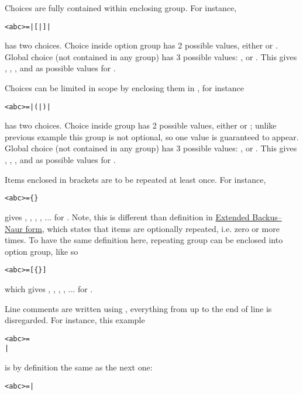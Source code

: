 \clearpage %

Choices are fully contained within enclosing group. For instance,
\begin{alltt}
<abc> =  |  [  |  ]  | 
\end{alltt}
has two choices. Choice inside option group \algfmt{[ ]} has 2 possible values,
either  or . Global choice (not contained in any group) has 3 possible
values: , \algfmt{[}\algfmt{|}\algfmt{]} or .
This gives , , ,  and  as possible values for
.

Choices can be limited in scope by enclosing them in \algfmt{( )},
for instance
\begin{alltt}
<abc> =  |  (  |  )  | 
\end{alltt}
has two choices. Choice inside group \algfmt{( )} has 2 possible values,
either  or ; unlike previous example this group is not optional, so one
value is guaranteed to appear. Global choice (not contained in any group) has 3 possible
values: , \algfmt{(}\algfmt{|}\algfmt{)}
or . This gives , , , and  as possible values
for .

Items enclosed in \algfmt{\{ \}} brackets are to be repeated at least once. For instance,
\begin{alltt}
<abc> =  \{  \} 
\end{alltt}
gives , , , , ... for .\newline
\indent
Note, this is different than definition in
\href{https://en.wikipedia.org/wiki/Extended_Backus%E2%80%93Naur_form#Table_of_symbols}{Extended Backus–Naur form},
which states that items are optionally repeated, i.e. zero or more times.\newline
\indent
To have the same definition here, repeating group can be enclosed into option group,
like so
\begin{alltt}
<abc> =  [ \{  \} ] 
\end{alltt}
which gives , , , , ... for .

Line comments are written using \algfmti{\$}, everything from \algfmti{\$} up to the
end of line is disregarded. For instance, this example
\begin{alltt}
<abc> = 
   
|  
\end{alltt}
is by definition the same as the next one:
\begin{alltt}
<abc> =  | 
\end{alltt}

